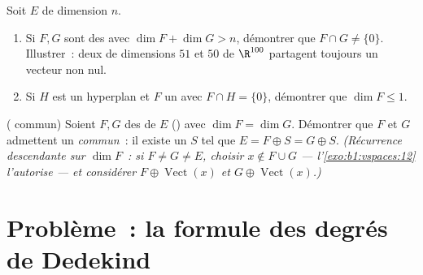 \begin{exercise}[$\star\star$]\label{exo:b1:findim:11}
Soit $E$ de dimension $n$.
\begin{enumerate}
  \item Si $F, G$ sont des  avec $\dim F + \dim G > n$,
        démontrer que $F \cap G \neq \{0\}$. Illustrer~: deux
         de dimensions $51$ et $50$ de $\R^{100}$
        partagent toujours un vecteur non nul.
  \item Si $H$ est un hyperplan et $F$ un  avec $F \cap H =
        \{0\}$, démontrer que $\dim F \leq 1$.
\end{enumerate}
\end{exercise}

\begin{exercise}[$\star\star\star$]\label{exo:b1:findim:12}
( commun) Soient $F, G$ des  de $E$ () avec $\dim F = \dim G$. Démontrer que $F$ et $G$
admettent un  \emph{commun}~: il existe un 
$S$ tel que $E = F \oplus S = G \oplus S$. \emph{(Récurrence
descendante sur $\dim F$~: si $F \neq G \neq E$, choisir $x \notin F
\cup G$ --- l'\cref{exo:b1:vspaces:12} l'autorise --- et considérer $F
\oplus \operatorname{Vect}(x)$ et $G \oplus \operatorname{Vect}(x)$.)}
\end{exercise}

\section{Problème~: la formule des degrés de Dedekind}


